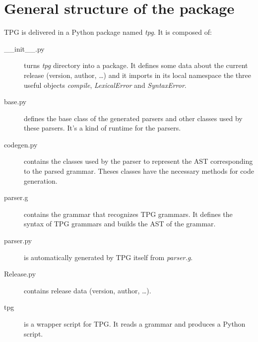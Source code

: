 \section{General structure of the package}

TPG is delivered in a Python package named \emph{tpg}.
It is composed of:

\begin{description}
	\item [\_\_init\_\_.py]
		turns \emph{tpg} directory into a package.
		It defines some data about the current release (version, author, \ldots) and it imports in its local namespace the three useful objects \emph{compile}, \emph{LexicalError} and \emph{SyntaxError}.
	\item [base.py]
		defines the base class of the generated parsers and other classes used by these parsers. It's a kind of runtime for the parsers.
	\item [codegen.py]
		contains the classes used by the parser to represent the AST corresponding to the parsed grammar. Theses classes have the necessary methods for code generation.
	\item [parser.g]
		contains the grammar that recognizes TPG grammars. It defines the syntax of TPG grammars and builds the AST of the grammar.
	\item [parser.py]
		is automatically generated by TPG itself from \emph{parser.g}.
	\item [Release.py]
		contains release data (version, author, \ldots).
	\item [tpg]
		is a wrapper script for TPG.
		It reads a grammar and produces a Python script.
\end{description}
